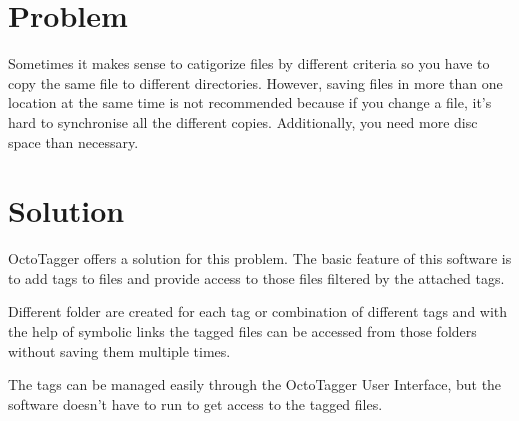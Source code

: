 \section{Problem}
\def\kapitelautor{Julian Lorenz}

Sometimes it makes sense to catigorize files by different criteria so you have to copy the same file to different directories. However, saving files in more than one location at the same time is not recommended because if you change a file, it's hard to synchronise all the different copies.  Additionally, you need more disc space than necessary.

\section{Solution}
\def\kapitelautor{Julian Lorenz}

OctoTagger offers a solution for this problem. The basic feature of this software is to add tags to files and provide access to those files filtered by the attached tags. 

Different folder are created for each tag or combination of different tags and with the help of symbolic links the tagged files can be accessed from those folders without saving them multiple times.

The tags can be managed easily through the OctoTagger User Interface, but the software doesn't have to run to get access to the tagged files.
